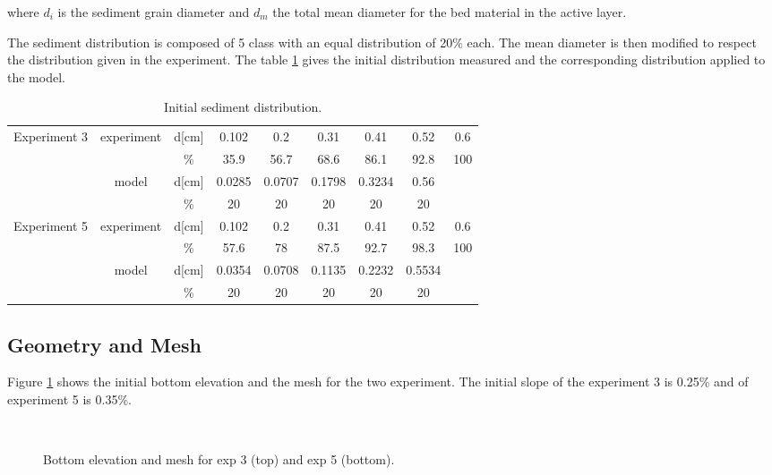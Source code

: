 where $d_i$ is the sediment grain diameter and $d_m$ the total mean diameter for the bed material in the active layer.

The sediment distribution is composed of 5 class with an equal distribution of 20\% each. The mean diameter is then modified to respect the distribution given in the experiment. The table \ref{guenter-t2d:tab:distrib} gives the initial distribution measured and the corresponding distribution applied to the model.

\begin{table}[h]
\centering
\begin{tabular}{|*{9}{c|}}
\hline
\multirow{4}{*}{Experiment 3} & \multirow{2}{*}{experiment} & d[cm] & 0.102 & 0.2 & 0.31 & 0.41 & 0.52 & 0.6 \\
 \cline{3-9}
 & & \% & 35.9 & 56.7 & 68.6 & 86.1 & 92.8 & 100 \\
 \cline{2-9}
 & \multirow{2}{*}{model} & d[cm] & 0.0285 & 0.0707 & 0.1798 & 0.3234 & 0.56 & \\
 \cline{3-9}
 & & \% & 20 & 20 & 20 & 20 & 20 & \\
\hline
\multirow{4}{*}{Experiment 5} & \multirow{2}{*}{experiment} & d[cm] & 0.102 & 0.2 & 0.31 & 0.41 & 0.52 & 0.6 \\
 \cline{3-9}
 & & \% & 57.6 & 78 & 87.5 & 92.7 & 98.3 & 100 \\
 \cline{2-9}
 & \multirow{2}{*}{model} & d[cm] & 0.0354 & 0.0708 & 0.1135 & 0.2232 & 0.5534 &\\
 \cline{3-9}
 & & \% & 20 & 20 & 20 & 20 & 20 & \\
\hline
\end{tabular}
\caption{Initial sediment distribution.}
\label{guenter-t2d:tab:distrib}
\end{table}

\subsection{Geometry and Mesh}
%
Figure \ref{guenter-t2d:fig:bottom} shows the initial bottom elevation and the mesh for the two experiment. The initial slope of the experiment 3 is 0.25\% and of experiment 5 is 0.35\%.

\begin{figure}[H]
 \centering
 \\
 \caption{Bottom elevation and mesh for exp 3 (top) and exp 5 (bottom).}
 \label{guenter-t2d:fig:bottom}
\end{figure}
%
